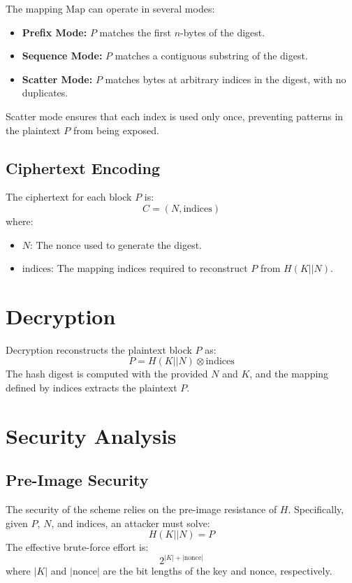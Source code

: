\documentclass[11pt,a4paper]{article}
\begin{document}
The mapping \( \text{Map} \) can operate in several modes:
\begin{itemize}
  \item \textbf{Prefix Mode:} \( P \) matches the first \( n \)-bytes of the digest.
  \item \textbf{Sequence Mode:} \( P \) matches a contiguous substring of the digest.
  \item \textbf{Scatter Mode:} \( P \) matches bytes at arbitrary indices in the digest, with no duplicates.
\end{itemize}

Scatter mode ensures that each index is used only once, preventing patterns in the plaintext \( P \) from being exposed.

\subsection*{Ciphertext Encoding}

The ciphertext for each block \( P \) is:
\[
C = (N, \text{indices})
\]
where:
\begin{itemize}
  \item \( N \): The nonce used to generate the digest.
  \item \( \text{indices} \): The mapping indices required to reconstruct \( P \) from \( H(K || N) \).
\end{itemize}

\section*{Decryption}

Decryption reconstructs the plaintext block \( P \) as:
\[
P = H(K || N) \otimes \text{indices}
\]
The hash digest is computed with the provided \( N \) and \( K \), and the mapping defined by \( \text{indices} \) extracts the plaintext \( P \).

\section*{Security Analysis}

\subsection*{Pre-Image Security}

The security of the scheme relies on the pre-image resistance of \( H \). Specifically, given \( P \), \( N \), and \( \text{indices} \), an attacker must solve:
\[
H(K || N) = P
\]
The effective brute-force effort is:
\[
2^{|K| + |\text{nonce}|}
\]
where \( |K| \) and \( |\text{nonce}| \) are the bit lengths of the key and nonce, respectively. 
\end{document}
